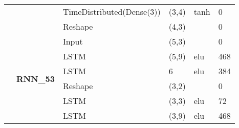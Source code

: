 \begin{table}[H]
\begin{center}
\begin{tabular}{ll|l|l|l|l|}
\multicolumn{1}{|l|}{}                                                                 &                                   & TimeDistributed(Dense(3))          & (3,4)                                & tanh                                     & 0                                           \\ \cline{3-6} 
\multicolumn{1}{|l|}{}                                                                 &                                   & Reshape                            & (4,3)                                &                                          & 0                                           \\ \cline{2-6} 
\multicolumn{1}{|l|}{}                                                                 & \multirow{8}{*}{\textbf{RNN\_53}} & Input                              & (5,3)                                &                                          & 0                                         \\ \cline{3-6} 
\multicolumn{1}{|l|}{}                                                                 &                                   & LSTM                               & (5,9)                                & elu                                     & 468                                         \\ \cline{3-6} 
\multicolumn{1}{|l|}{}                                                                 &                                   & LSTM                               & 6                                    & elu                                     & 384                                           \\ \cline{3-6} 
\multicolumn{1}{|l|}{}                                                                 &                                   & Reshape                            & (3,2)                                &                                          & 0                                          \\ \cline{3-6} 
\multicolumn{1}{|l|}{}                                                                 &                                   & LSTM                               & (3,3)                                & elu                                     & 72                                         \\ \cline{3-6} 
\multicolumn{1}{|l|}{}                                                                 &                                   & LSTM                               & (3,9)                                & elu                                     & 468                                          \\ \cline{3-6} 

\end{tabular}
\end{center}
\end{table}
